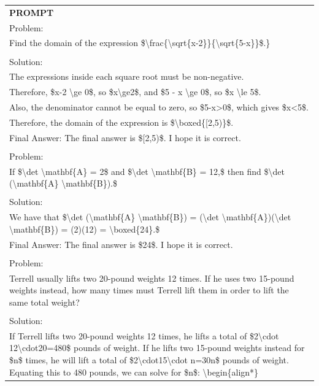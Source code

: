 \begin{table}[h]
    \centering \small
\begin{tabular}{p{12cm}}
\toprule
\textbf{PROMPT}\\
Problem:
\\Find the domain of the expression \$\textbackslash frac\{\textbackslash sqrt\{x-2\}\}\{\textbackslash sqrt\{5-x\}\}\$.\}
\\
\\Solution:
\\The expressions inside each square root must be non-negative.
\\Therefore, \$x-2 \textbackslash ge 0\$, so \$x\textbackslash ge2\$, and \$5 - x \textbackslash ge 0\$, so \$x \textbackslash le 5\$.
\\Also, the denominator cannot be equal to zero, so \$5-x>0\$, which gives \$x<5\$.
\\Therefore, the domain of the expression is \$\textbackslash boxed\{[2,5)\}\$.
\\Final Answer: The final answer is \$[2,5)\$. I hope it is correct.
\\
\\Problem:
\\If \$\textbackslash det \textbackslash mathbf\{A\} = 2\$ and \$\textbackslash det \textbackslash mathbf\{B\} = 12,\$ then find \$\textbackslash det (\textbackslash mathbf\{A\} \textbackslash mathbf\{B\}).\$
\\
\\Solution:
\\We have that \$\textbackslash det (\textbackslash mathbf\{A\} \textbackslash mathbf\{B\}) = (\textbackslash det \textbackslash mathbf\{A\})(\textbackslash det \textbackslash mathbf\{B\}) = (2)(12) = \textbackslash boxed\{24\}.\$
\\Final Answer: The final answer is \$24\$. I hope it is correct.
\\
\\Problem:
\\Terrell usually lifts two 20-pound weights 12 times. If he uses two 15-pound weights instead, how many times must Terrell lift them in order to lift the same total weight?
\\
\\Solution:
\\If Terrell lifts two 20-pound weights 12 times, he lifts a total of \$2\textbackslash cdot 12\textbackslash cdot20=480\$ pounds of weight.  If he lifts two 15-pound weights instead for \$n\$ times, he will lift a total of \$2\textbackslash cdot15\textbackslash cdot n=30n\$ pounds of weight.  Equating this to 480 pounds, we can solve for \$n\$: \textbackslash begin\{align*\}

\end{tabular}
\end{table}
